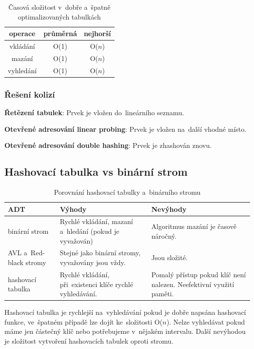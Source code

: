 \begin{table}[ht]
	\centering
	\caption{Časová složitost v~dobře a~špatně optimalizovaných tabulkách}
	\begin{tabular}{|c||c|c|}\hline
		operace   & průměrná & nejhorší \\\hline\hline
		vkládání  & O(1)     & O($n$)   \\\hline
		mazání    & O(1)     & O($n$)   \\\hline
		vyhledání & O(1)     & O($n$)   \\\hline
	\end{tabular}
\end{table}

\subsubsection{Řešení kolizí}

\textbf{Řetězení tabulek}: Prvek je vložen do~lineárního seznamu.

\textbf{Otevřené adresování linear probing}: Prvek je vložen na~další vhodné místo.

\textbf{Otevřené adresování double hashing}: Prvek je zhashován znovu.

\subsection{Hashovací tabulka vs binární strom}

\begin{table}[ht]
	\caption{Porovnání hashovací tabulky a~binárního stromu}
	\begin{tabularx}{\textwidth}{|l||X|X|}\hline
		ADT & Výhody & Nevýhody \\\hline\hline
		binární strom & Rychlé vkládání, mazaní a~hledání (pokud je vyvažován) & Algoritmus mazání je časově náročný. \\\hline
		AVL a~Red-black stromy & Stejné jako binární stromy, vyvažovány jsou vždy. & Jsou složité. \\\hline
		hashovací tabulka & Rychlé vkládání, při~existenci klíče rychlé vyhledávání. & Pomalý přístup pokud klíč není nalezen. Neefektivní využití paměti. \\\hline
	\end{tabularx}
\end{table}

Hashovací tabulka je rychlejší na~vyhledávání pokud je dobře napsána hashovací funkce, ve~špatném případě lze dojít ke~složitosti O($n$). Nelze vyhledávat pokud máme jen částečný klíč nebo potřebujeme v~nějakém intervalu. Další nevýhodou je složitost vytvoření hashovacích tabulek oproti stromu.


